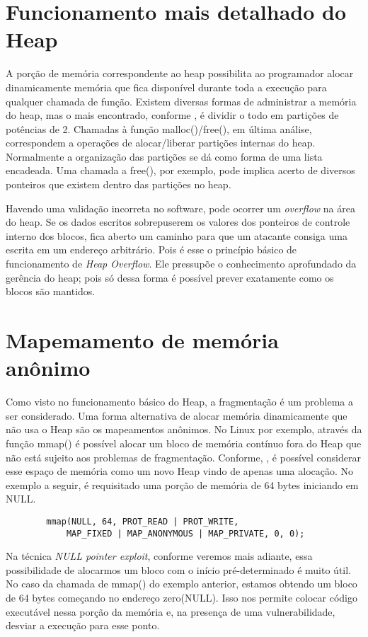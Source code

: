 	\section{Funcionamento mais detalhado do Heap}
	A porção de memória correspondente ao heap possibilita ao programador alocar dinamicamente memória
	que fica disponível durante toda a execução para qualquer chamada de função.
	Existem diversas formas de administrar a memória do heap, mas o mais encontrado, conforme
	\cite{Love2007}, é dividir o todo em partições de potências de 2. Chamadas à função malloc()/free(),
	em última análise, correspondem a operações de alocar/liberar partições internas do heap.
	Normalmente a organização das partições se dá como forma de uma lista encadeada.
	Uma chamada a free(), por exemplo, pode implica acerto de diversos ponteiros que existem
	dentro das partições no heap.
	 

	Havendo uma validação incorreta no software, pode ocorrer um \textsl{overflow} na área do
	heap. Se os dados escritos sobrepuserem os valores dos ponteiros de controle interno dos blocos,
	fica aberto um caminho para que um atacante consiga uma escrita em um endereço arbitrário.
	Pois é esse o princípio básico de funcionamento de \textsl{Heap Overflow}. Ele pressupõe
	o conhecimento aprofundado da gerência do heap; pois só dessa forma é possível prever
	exatamente como os blocos são mantidos.

	\section{Mapemamento de memória anônimo}
	Como visto no funcionamento básico do Heap, a fragmentação é um problema a ser considerado.
	Uma forma alternativa de alocar memória dinamicamente que não usa o Heap são os mapeamentos anônimos.
	No Linux por exemplo, através da função mmap() é possível alocar um bloco de memória contínuo
	fora do Heap que não está sujeito aos problemas de fragmentação.
	Conforme, \cite{Love2007}, é possível considerar esse espaço de memória como um novo Heap
	vindo de apenas uma alocação.
	No exemplo a seguir, é requisitado uma porção de memória de 64 bytes iniciando em NULL.
	\begin{verbatim}
		mmap(NULL, 64, PROT_READ | PROT_WRITE,
			MAP_FIXED | MAP_ANONYMOUS | MAP_PRIVATE, 0, 0);
	\end{verbatim}
	Na técnica \textsl{NULL pointer exploit}, conforme veremos mais adiante, essa possibilidade
	de alocarmos um bloco com o início pré-determinado é muito útil.
	No caso da chamada de mmap() do exemplo anterior, estamos obtendo um bloco de 64 bytes começando
	no endereço zero(NULL). Isso nos permite colocar código executável nessa porção da memória e,
	na presença de uma vulnerabilidade, desviar a execução para esse ponto.
	
